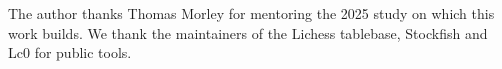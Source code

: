 The author thanks Thomas Morley for mentoring the 2025 study on which this work builds. We thank the
maintainers of the Lichess tablebase, Stockfish and Lc0 for public tools.
